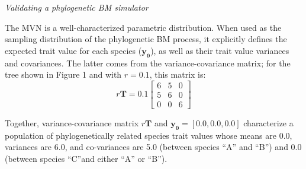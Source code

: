 \documentclass[oneside]{article}
\begin{document}
\begin{tcolorbox}[breakable, width=\textwidth, colback=gray!10, boxrule=0pt,
  title=Box 1: Models characterized by well-known parametric distributions, fonttitle=\bfseries]
\emph{Validating a phylogenetic BM simulator}

The MVN is a well-characterized parametric distribution.
When used as the sampling distribution of the phylogenetic BM
process, it explicitly defines the expected trait value for
each species ($\boldsymbol{y_0}$), as well as their trait value
variances and covariances.
The latter comes from the variance-covariance matrix; for the
tree shown in Figure 1 %
and with $r = 0.1$, this matrix
is:
\begin{equation}
  r\boldsymbol{T} = 0.1
  \begin{bmatrix}
    6 & 5 & 0\\
    5 & 6 & 0\\
    0 & 0 & 6
  \end{bmatrix}
  \label{eq:mat}
\end{equation}

Together, variance-covariance matrix $r\boldsymbol{T}$ and
$\boldsymbol{y_0} = [0.0, 0.0, 0.0]$ characterize a
population of phylogenetically related species trait values
whose means are 0.0, variances are 6.0, and co-variances
are 5.0 (between species ``A'' and ``B'') and 0.0 (between
species ``C''and
either ``A'' or ``B'').

\vspace{.25cm}


\end{tcolorbox}
\end{document}

